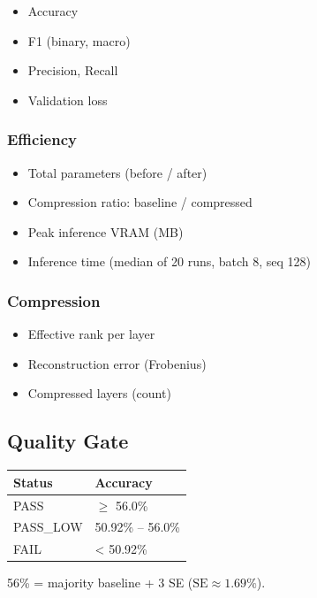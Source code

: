 \begin{itemize}
\item Accuracy
\item F1 (binary, macro)
\item Precision, Recall
\item Validation loss

\end{itemize}
\subsubsection{Efficiency}

\begin{itemize}
\item Total parameters (before / after)
\item Compression ratio: baseline / compressed
\item Peak inference VRAM (MB)
\item Inference time (median of 20 runs, batch 8, seq 128)

\end{itemize}
\subsubsection{Compression}

\begin{itemize}
\item Effective rank per layer
\item Reconstruction error (Frobenius)
\item Compressed layers (count)

\end{itemize}
\subsection{Quality Gate}

\begin{table}[H]
\centering
\small
\begin{tabular}{ll}
\toprule
\textbf{Status} & \textbf{Accuracy} \\
\midrule
PASS & $\ge$ 56.0\% \\
PASS\_LOW & 50.92\% -- 56.0\% \\
FAIL & \textless{} 50.92\% \\
\bottomrule
\end{tabular}
\end{table}

56\% = majority baseline + 3 SE ($\text{SE} \approx 1.69\%$).

